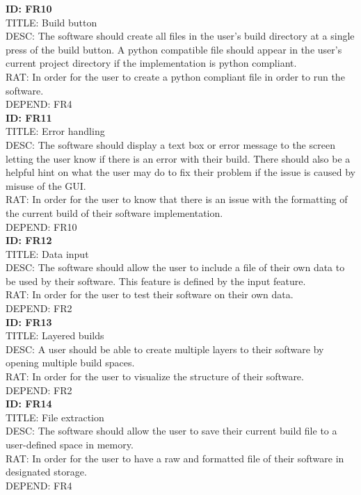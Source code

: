 \documentclass[journal,10pt,onecolumn,compsoc]{IEEEtran} \usepackage[margin=1.0in]{geometry} \usepackage{pdfpages} \usepackage{graphicx}
\begin{document}
\noindent
\textbf{ID: FR10}\\
TITLE: Build button\\
DESC: The software should create all files in the user's build directory at a single press of the build button. 
A python compatible file should appear in the user's current project directory if the implementation is python compliant.\\
RAT: In order for the user to create a python compliant file in order to run the software.\\
DEPEND: FR4\\

\noindent
\textbf{ID: FR11}\\
TITLE: Error handling\\
DESC: The software should display a text box or error message to the screen letting the user know if there is an error with their build. 
There should also be a helpful hint on what the user may do to fix their problem if the issue is caused by misuse of the GUI.\\
RAT: In order for the user to know that there is an issue with the formatting of the current build of their software implementation.\\
DEPEND: FR10\\

\noindent
\textbf{ID: FR12}\\
TITLE: Data input\\
DESC: The software should allow the user to include a file of their own data to be used by their software.
This feature is defined by the input feature.\\
RAT: In order for the user to test their software on their own data.\\
DEPEND: FR2\\

\noindent
\textbf{ID: FR13}\\
TITLE: Layered builds\\
DESC: A user should be able to create multiple layers to their software by opening multiple build spaces.\\
RAT: In order for the user to visualize the structure of their software.\\
DEPEND: FR2\\

\noindent
\textbf{ID: FR14}\\
TITLE: File extraction\\
DESC: The software should allow the user to save their current build file to a user-defined space in memory.\\
RAT: In order for the user to have a raw and formatted file of their software in designated storage.\\
DEPEND: FR4\\
\end{document}
